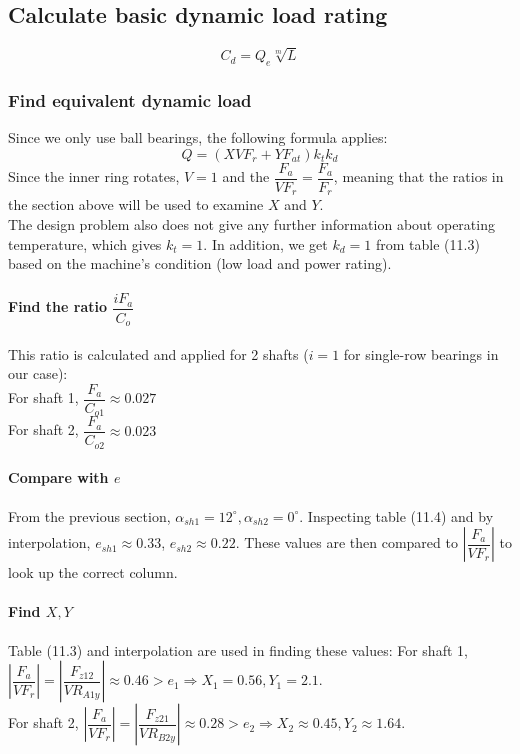 \subsection{Calculate basic dynamic load rating}
\[C_d = Q_e\sqrt[m]{L}\]
\subsubsection{Find equivalent dynamic load} Since we only use ball bearings, the following formula applies:
\[Q = (XVF_r+YF_{at})k_tk_d\]
Since the inner ring rotates, $ V = 1 $ and the $\dfrac{F_a}{VF_r}=\dfrac{F_a}{F_r}$, meaning that the ratios in the section above will be used to examine $X$ and $Y$.\\
The design problem also does not give any further information about operating temperature, which gives $ k_t = 1 $. In addition, we get $ k_d = 1 $ from table (11.3) based on the machine's condition (low load and power rating).
\paragraph{Find the ratio $ \dfrac{iF_a}{C_o} $} This ratio is calculated and applied for 2 shafts ($ i = 1 $ for single-row bearings in our case):\\
For shaft 1, $ \dfrac{F_a}{C_{o1}} \approx 0.027$\\
For shaft 2, $ \dfrac{F_a}{C_{o2}}  \approx  0.023$
\paragraph{Compare with $ e $}
From the previous section, $ \alpha_{sh1} = 12^\circ, \alpha_{sh2} = 0^\circ $. Inspecting table (11.4) and by interpolation, $ e_{sh1} \approx  0.33$, $e_{sh2}  \approx 0.22 $. These values are then compared to $ \left| \dfrac{F_a}{VF_r} \right| $ to look up the correct column.
\paragraph{Find $ X,Y $} Table (11.3) and interpolation are used in finding these values:\vskip2mm
For shaft 1, $ \left| \dfrac{F_a}{VF_r} \right| = \left| \dfrac{F_{z12}}{VR_{A1y}} \right| \approx 0.46 > e_{1} \Rightarrow X_{1} = 0.56, Y_{1} = 2.1$.\\
For shaft 2, $ \left| \dfrac{F_a}{VF_r} \right| = \left| \dfrac{F_{z21}}{VR_{B2y}} \right| \approx 0.28 > e_{2} \Rightarrow X_{2}  \approx  0.45, Y_{2}  \approx  1.64$.
